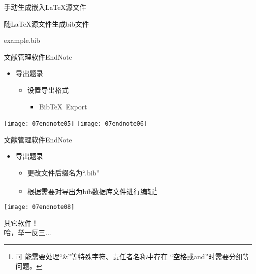 \documentclass[fontset = none, t]{ctexbeamer}
\begin{document}
\begin{frame}[fragile]{手动生成}{嵌入\LaTeX 源文件}
\begin{spacing}{1.3}
\begin{center}
\begin{minipage}[h]{0.55\linewidth}
\begin{textcb}{随\LaTeX 源文件生成bib文件}
\begin{filecontents}{example.bib}
\begin{frame}[fragile]{文献管理软件}{EndNote}
  \begin{spacing}{1.2}
    \begin{itemize}
    \item 导出题录
      \begin{itemize}
      \item 设置导出格式
        \begin{itemize}
        \item Bib\TeX\ Export
        \end{itemize}
      \end{itemize}
    \end{itemize}
    \begin{center}
      \texttt{[image: 07endnote05]}\quad
      \texttt{[image: 07endnote06]}
    \end{center}
  \end{spacing}
\end{frame}

\begin{frame}[fragile]{文献管理软件}{EndNote}
  \begin{spacing}{1.2}
    \begin{itemize}
    \item 导出题录
      \begin{itemize}
      \item 更改文件后缀名为\enquote{.bib}
      \item 根据需要对导出为bib数据库文件进行编辑\footnote[frame,2]{可
          能需要处理\enquote{\&}等特殊字符、责任者名称中存在
          \enquote{空格或and}时需要分组等问题。}
      \end{itemize}
    \end{itemize}    
    \begin{center}
      \texttt{[image: 07endnote08]}
    \end{center}
  \end{spacing}
\end{frame}

\begin{frame}
  其它软件！\\
  哈，举一反三...
\end{frame}

\end{filecontents}
\end{textcb}
\end{minipage}
\end{center}
\end{spacing}
\end{frame}
\end{document}
